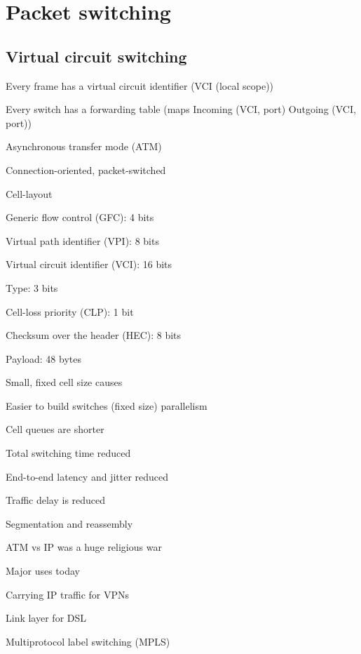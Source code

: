 \section{Packet switching}

\subsection{Virtual circuit switching}
\enumstart
	\item Every frame has a virtual circuit identifier (VCI (local scope))
	\item Every switch has a forwarding table (maps Incoming (VCI, port) \arrow Outgoing (VCI, port))
	\item Asynchronous transfer mode (ATM)
	\enumstart
		\item Connection-oriented, packet-switched
		\item Cell-layout
		\enumstart
			\item Generic flow control (GFC): 4 bits
			\item Virtual path identifier (VPI): 8 bits
			\item Virtual circuit identifier (VCI): 16 bits
			\item Type: 3 bits
			\item Cell-loss priority (CLP): 1 bit
			\item Checksum over the header (HEC): 8 bits
			\item Payload: 48 bytes
		\enumend
		\item Small, fixed cell size causes
		\enumstart
			\item Easier to build switches (fixed size) \arrow parallelism
			\item Cell queues are shorter
			\item Total switching time reduced
			\item End-to-end latency and jitter reduced
			\item Traffic delay is reduced
		\enumend
		\item Segmentation and reassembly
		\item ATM vs IP was a huge religious war
		\item Major uses today
		\enumstart
			\item Carrying IP traffic for VPNs
			\item Link layer for DSL
		\enumend
	\enumend
	\item Multiprotocol label switching (MPLS)
\enumend

